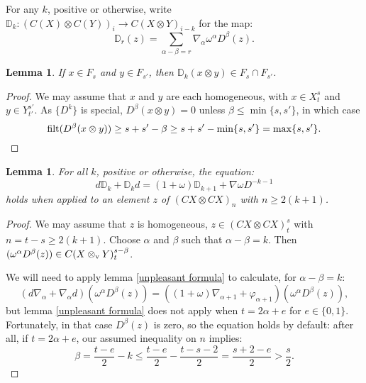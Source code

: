 \documentclass[11pt]{amsart}
\theoremstyle{plain}
\newtheorem{lem}[thm]{Lemma}
\theoremstyle{definition}
\let\phi\varphi
\renewcommand{\to}{\longrightarrow}
\theoremstyle{plain}
\newcommand{\twist}{\omega}
\newcommand{\Nabla}{\nabla}
\newcommand{\filt}{\textup{filt}}
\begin{document}
\begin{second quadrant homotopy}
For any $k$, positive or otherwise, write $\mathbb{D}_k:(C(X)\otimes C(Y))_i\to C(X\otimes Y)_{i-k}$ for the map:
\[\mathbb{D}_r(z)= \sum_{\alpha-\beta=r}\Nabla_\alpha\twist^\alpha D^\beta(z).
\]
\begin{lem}\label{DkIsNiceToFiltration}
If $x\in F_s$ and $y\in F_{s'}$, then $\mathbb{D}_k(x\otimes  y)\in F_s\cap F_{s'}$.
\end{lem}
\begin{proof}
We may assume that $x$ and $y$ are each homogeneous, with $x\in X^{s}_{t}$ and $y\in Y^{s'}_{t'}$. As $\{D^k\}$ is special, $D^{\beta}(x\otimes y)=0$ unless $\beta\leq \min\{s,s'\}$, in which case
\[\filt(D^{\beta}(x\otimes y))\geq s+s'-\beta\geq s+s'-\min\{s,s'\}=\max\{s,s'\}.\qedhere\]
\end{proof}
\begin{lem}\label{boundaryVsBBD}
For all $k$, positive or otherwise, the equation:
\[d\mathbb{D}_k+\mathbb{D}_kd= (1+\twist)\mathbb{D}_{k+1}+\Nabla\twist D^{-k-1}\]
holds when applied to an element $z$ of $(CX\otimes CX)_{n}$ with $n\geq 2(k+1)$.
\end{lem}
\begin{proof}
\newcommand{\twolinesum}[2]{\mathop{\sum_{\mathclap{#1}}}_{\mathclap{#2}}}
\newcommand{\onelinesum}[1]{\sum_{\mathclap{#1}}}
We may assume that $ z$ is homogeneous, $z\in (CX\otimes CX)_{t}^{s}$ with $n=t-s\geq2(k+1)$. Choose $\alpha$ and $\beta$ such that $\alpha-\beta=k$. Then $(\twist^\alpha D^\beta(z))\in C(X\otimes_\textup{v} Y)^{s-\beta}_{t}$.

We will need to apply lemma \ref{unpleasant formula} to calculate, for $\alpha-\beta=k$:
\[(d\Nabla_\alpha+\Nabla_\alpha d)(\twist^\alpha D^\beta(z))=((1+\twist)\Nabla_{\alpha+1}+\phi_{\alpha+1} )(\twist^\alpha D^\beta(z)),\]
but lemma \ref{unpleasant formula} does not apply when $t=2\alpha+e$ for $e\in\{0,1\}$. Fortunately, in that case $D^\beta(z)$ is zero, so the equation holds by default: after all, if $t=2\alpha+e$, our assumed inequality on $n$ implies:
\[\beta=\frac{t-e}{2}-k\leq \frac{t-e}{2}-\frac{t-s-2}{2}=\frac{s+2-e}{2}>\frac{s}{2}.\]


\end{proof}
\end{second quadrant homotopy}
\end{document}
